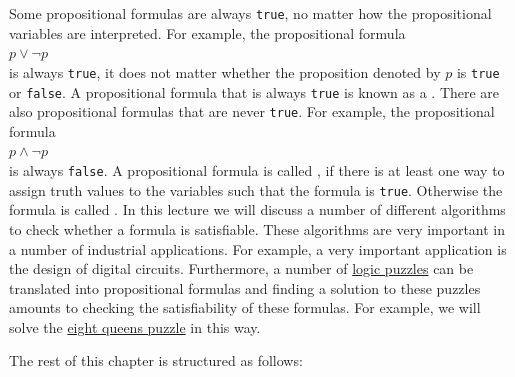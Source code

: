 Some propositional formulas are always \texttt{true}, no matter how the propositional variables are interpreted.
For example, the propositional formula 
\\[0.2cm]
\hspace*{1.3cm}
$p \vee \neg p$
\\[0.2cm]
is always \texttt{true}, it does not matter whether the proposition denoted by $p$ is \texttt{true} or \texttt{false}.  A propositional
formula that is always \texttt{true} is known as a  .  There are also propositional
formulas that are never \texttt{true}.  For example, the propositional formula
\\[0.2cm]
\hspace*{1.3cm}
$p \wedge \neg p$
\\[0.2cm]
is always \texttt{false}.  A propositional formula is called , if there is at least
one way to assign truth values to the variables such that the formula is \texttt{true}.  Otherwise the formula is called
.  In this lecture we will discuss a number of different algorithms to
check whether a formula is satisfiable.  These algorithms are very important in a number of industrial
applications.  For example, a very important application is the design of digital circuits.
Furthermore, a number of \href{https://en.wikipedia.org/wiki/Category:Logic_puzzles}{logic puzzles} can be
translated into propositional formulas and finding a solution to these 
puzzles amounts to checking the satisfiability of these formulas.  For example, we will solve the
\href{https://en.wikipedia.org/wiki/Eight_queens_puzzle}{eight queens puzzle} in this way.

The rest of this chapter is structured as follows:

